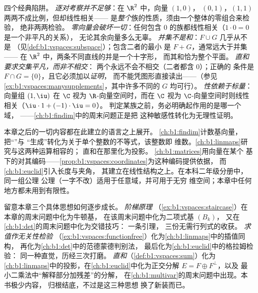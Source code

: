 \begin{remark}[常见陷阱]
\label{rem:b1:vspaces:pitfalls}
四个经典陷阱。
\emph{逐对考察并不足够}：在 $\R^2$ 中，向量 $(1,0)$，
$(0,1)$，$(1,1)$ 两两不成比例，但却线性相关——
是\emph{整个}族的性质，须由一个整体的零组合来检验，
绝非两两检验。
\emph{零向量会破坏一切}：任何包含
$0$ 的族都线性相关（$1\cdot 0 = 0$ 是一个非平凡的关系），
无论其余向量多么无辜。
\emph{并集不是和}：$F \cup G$ 几乎从不是
（见\cref{def:b1:vspaces:subspace}）；包含二者的最小
是 $F + G$，通常远大于并集——
在 $\R^2$ 中，两条不同直线的并是一个十字形，
而其和恰为整个平面。
\emph{直和要求交集平凡，而非不相交}：
两个永远不会不相交（二者都含 $0$）；正确的
条件是 $F \cap G = \{0\}$，且它必须加以\emph{证明}，
而不能凭图形直接读出——（参见
\cref{ex:b1:vspaces:manysupplements}，其中许多不同的 $G$
均可行）。
\emph{性依赖于标量}：向量组 $(1, \iu)$
在 $\C$ 视为 $\R$-向量空间时，而在 $\C$
视为 $\C$-向量空间时则线性相关（$\iu\cdot 1 + (-1)\cdot\iu = 0$）。
判定某族之前，务必明确起作用的是哪一个域，
——\cref{ch:b1:findim}中的周末问题正是把
这种敏感性转化为无理性证明。
\end{remark}

\begin{remark}[这套语言的后续应用]
\label{rem:b1:vspaces:whereused}
本章之后的一切内容都在此建立的语言之上展开。
\cref{ch:b1:findim}计数基向量，把“”与
“生成”转化为关于单个整数的不等式，该整数即
维数。\cref{ch:b1:linmaps}研究与这两种运算相容的；
直和在那里化为投影。
\cref{ch:b1:matrices}用向量在某个
基下的对其编码——\cref{prop:b1:vspaces:coordinates}为这种编码提供依据，
而\cref{ch:b1:euclid}引入长度与夹角，
其建立在线性结构之上。在本科二年级分册中，同一组公理
公理（一字不改）适用于任意域，并可用于无穷
维空间；本章中任何地方都未用到有限性。
\end{remark}

\begin{remark}
\label{rem:b1:vspaces:threads}
留意本章三个具体思想如何逐步成长。
\emph{阶梯原理}
（\cref{ex:b1:vspaces:staircase}）在本章的周末问题中化为牛顿基，
在该周末问题中化为二项式基 $(B_k)$，
又在\cref{ch:b1:det}的周末问题中化为交错技巧：
一条引理，
三份无需行列式的收获。
\emph{求值作无关性检验}
（\cref{ex:b1:vspaces:functionfree}）化为\cref{ch:b1:linmaps}中的插值同构，
再化为\cref{ch:b1:det}中的范德蒙德判别法，
最后化为\cref{ch:b1:euclid}中的格拉姆检验：
同一种直觉，历经三次打磨。
\emph{直和}（\cref{def:b1:vspaces:sum}）化为
\cref{ch:b1:linmaps}中的投影，在\cref{ch:b1:euclid}中化为正交分解 $E =
F \oplus F^\perp$，以及
最小二乘法中“解释部分加残差”的分解，
在\cref{ch:b1:multivar}的周末问题中出现。本书极少内容，
归根结底，不过是这三种思想
换了新装而已。
\end{remark}


